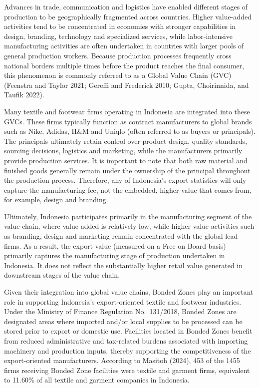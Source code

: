\documentclass[
  manuscript=article,
  layout=publish,
  year=2026,
  volume=1,
]{den}
\begin{document}
Advances in trade, communication and logistics have enabled different
stages of production to be geographically fragmented across countries.
Higher value-added activities tend to be concentrated in economies with
stronger capabilities in design, branding, technology and specialized
services, while labor-intensive manufacturing activities are often
undertaken in countries with larger pools of general production workers.
Because production processes frequently cross national borders multiple
times before the product reaches the final consumer, this phenomenon is
commonly referred to as a Global Value Chain (GVC) (Feenstra and Taylor
2021; Gereffi and Frederick 2010; Gupta, Choirinnida, and Taufik 2022).

Many textile and footwear firms operating in Indonesia are integrated
into these GVCs. These firms typically function as contract
manufacturers to global brands such as Nike, Adidas, H\&M and Uniqlo
(often referred to as buyers or principals). The principals ultimately
retain control over product design, quality standards, sourcing
decisions, logistics and marketing, while the manufacturers primarily
provide production services. It is important to note that both raw
material and finished goods generally remain under the ownership of the
principal throughout the production process. Therefore, any of
Indonesia's export statistics will only capture the manufacturing fee,
not the embedded, higher value that comes from, for example, design and
branding.

Ultimately, Indonesia participates primarily in the manufacturing
segment of the value chain, where value added is relatively low, while
higher value activities such as branding, design and marketing remain
concentrated with the global lead firms. As a result, the export value
(measured on a Free on Board basis) primarily captures the manufacturing
stage of production undertaken in Indonesia. It does not reflect the
substantially higher retail value generated in downstream stages of the
value chain.

Given their integration into global value chains, Bonded Zones play an
important role in supporting Indonesia's export-oriented textile and
footwear industries. Under the Ministry of Finance Regulation
No.~131/2018, Bonded Zones are designated areas where imported and/or
local supplies to be processed can be stored prior to export or domestic
use. Facilities located in Bonded Zones benefit from reduced
administrative and tax-related burdens associated with importing
machinery and production inputs, thereby supporting the competitiveness
of the export-oriented manufacturers. According to Masitoh (2024), 453
of the 1455 firms receiving Bonded Zone facilities were textile and
garment firms, equivalent to 11.60\% of all textile and garment
companies in Indonesia.
\end{document}
